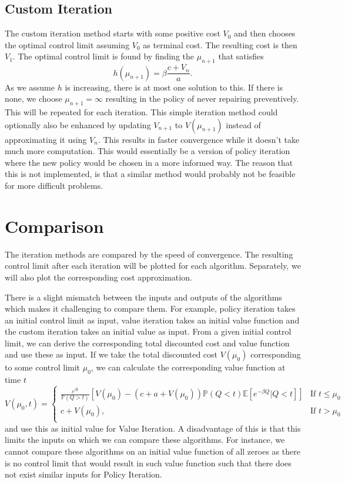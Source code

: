 \subsection{Custom Iteration}
The custom iteration method starts with some positive cost $V_0$ and then chooses the optimal control limit assuming $V_0$ as terminal cost.
The resulting cost is then $V_1$.
The optimal control limit is found by finding the $\mu_{n+1}$ that satisfies
$$
h(\mu_{n+1})= \beta\frac{c+V_n}{a}.
$$
As we assume $h$ is increasing, there is at most one solution to this. If there is none,  we choose $\mu_{n+1}=\infty$ resulting in the policy of never repairing preventively.
This will be repeated for each iteration.
This simple iteration method could optionally also be enhanced by updating $V_{n+1}$ to $V(\mu_{n+1})$ instead of approximating it using $V_n$.
This results in faster convergence while it doesn't take much more computation.
This would essentially be a version of policy iteration where the new policy would be chosen in a more informed way.
The reason that this is not implemented, is that a similar method would probably not be feasible for more difficult problems.

\section{Comparison}
The iteration methods are compared by the speed of convergence.
The resulting control limit after each iteration will be plotted for each algorithm.
Separately, we will also plot the corresponding cost approximation.

There is a slight mismatch between the inputs and outputs of the algorithms which makes it challenging to compare them.
For example, policy iteration takes an initial control limit as input, value iteration takes an initial value function and the custom iteration takes an initial value as input.
From a given initial control limit, we can derive the corresponding total discounted cost and value function and use these as input.
If we take the total discounted cost $V(\mu_0)$ corresponding to some control limit $\mu_0$, we can calculate the corresponding value function at time $t$
\begin{equation}
V(\mu_0,t)=\begin{cases}
\frac{ e^{\beta t}}{\mathbb{P}(Q>t)} [V(\mu_0) - (c+a+V(\mu_0))\mathbb{P}(Q<t)\mathbb{E}[e^{-\beta Q}|Q<t]]&\text{If }t\leq \mu_0\\
c+V(\mu_0),& \text{If }t>\mu_0\\
\end{cases}
\end{equation}
and use this as initial value for Value Iteration.
A disadvantage of this is that this limits the inputs on which we can compare these algorithms.
For instance, we cannot compare these algorithms on an initial value function of all zeroes as there is no control limit that would result in such value function such that there does not exist similar inputs for Policy Iteration.


